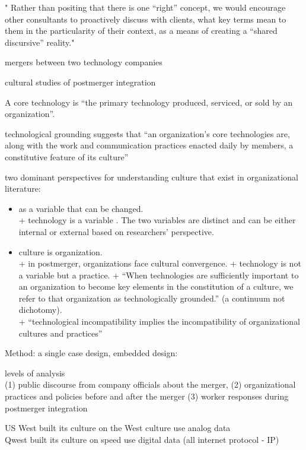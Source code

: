 \documentclass[
]{book}
\providecommand{\tightlist}{%
  \setlength{\itemsep}{0pt}\setlength{\parskip}{0pt}}
\begin{document}
" Rather than positing that there is one ``right'' concept, we would encourage other consultants to proactively discuss with clients, what key terms mean to them in the particularity of their context, as a means of creating a ``shared discursive'' reality."

\citep{Leonardi_2008}
mergers between two technology companies

cultural studies of postmerger integration

A core technology is ``the primary technology produced, serviced, or sold by an organization''.

technological grounding suggests that ``an organization's core technologies are, along with the work and communication practices enacted daily by members, a constitutive feature of its culture''

two dominant perspectives for understanding culture that exist in organizational literature:

\begin{itemize}
\tightlist
\item
  as a variable that can be changed.\\
  + technology is a variable . The two variables are distinct and can be either internal or external based on researchers' perspective.\\
\item
  culture is organization.\\
  + in postmerger, organizations face cultural convergence.
  + technology is not a variable but a practice.
  + ``When technologies are sufficiently important to an organization to become key elements in the constitution of a culture, we refer to that organization as technologically grounded.'' (a continuum not dichotomy).\\
  + ``technological incompatibility implies the incompatibility of organizational cultures and practices''
\end{itemize}

Method: a single case design, embedded design:

levels of analysis\\
(1) public discourse from company officials about the merger,
(2) organizational practices and policies before and after the merger
(3) worker responses during postmerger integration

US West built its culture on the West culture use analog data\\
Qwest built its culture on speed use digital data (all internet protocol - IP)
\end{document}
